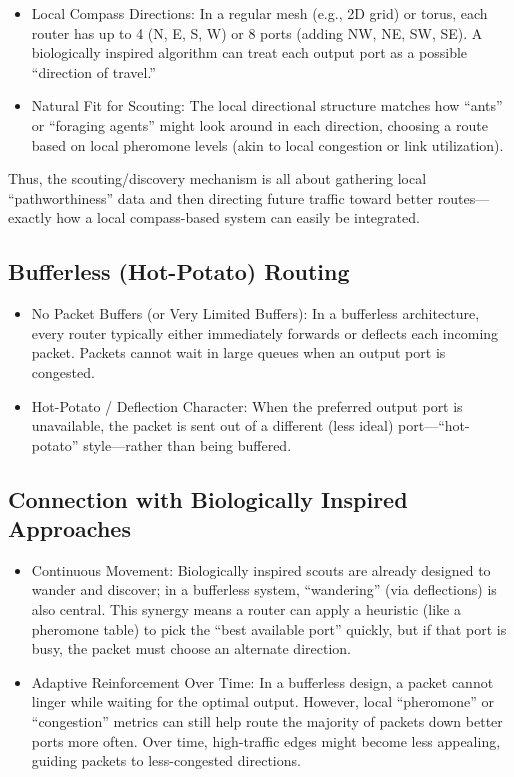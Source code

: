 \documentclass[../../../OAE-SPEC-MAIN.tex]{subfiles}
\begin{document}
\begin{itemize}
\item Local Compass Directions: In a regular mesh (e.g., 2D grid) or torus, each router has up to 4 (N, E, S, W) or 8 ports (adding NW, NE, SW, SE). A biologically inspired algorithm can treat each output port as a possible ``direction of travel.''
\item Natural Fit for Scouting: The local directional structure matches how “ants” or “foraging agents” might look around in each direction, choosing a route based on local pheromone levels (akin to local congestion or link utilization).
\end{itemize}

Thus, the scouting/discovery mechanism is all about gathering local ``pathworthiness'' data and then directing future traffic toward better routes—exactly how a local compass-based system can easily be integrated.

\subsection{Bufferless (Hot-Potato) Routing}

\begin{itemize}
\item No Packet Buffers (or Very Limited Buffers): In a bufferless architecture, every router typically either immediately forwards or deflects each incoming packet. Packets cannot wait in large queues when an output port is congested.
\item Hot-Potato / Deflection Character: When the preferred output port is unavailable, the packet is sent out of a different (less ideal) port—``hot-potato'' style—rather than being buffered.
\end{itemize}

\subsection{Connection with Biologically Inspired Approaches}
\begin{itemize}
\item Continuous Movement: Biologically inspired scouts are already designed to wander and discover; in a bufferless system, “wandering” (via deflections) is also central. This synergy means a router can apply a heuristic (like a pheromone table) to pick the “best available port” quickly, but if that port is busy, the packet must choose an alternate direction.
\item Adaptive Reinforcement Over Time: In a bufferless design, a packet cannot linger while waiting for the optimal output. However, local “pheromone” or “congestion” metrics can still help route the majority of packets down better ports more often. Over time, high-traffic edges might become less appealing, guiding packets to less-congested directions.
\end{itemize}
\end{document}
